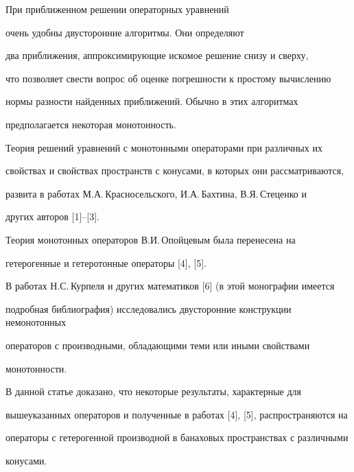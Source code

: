 \maketitle


\label{begin}





При приближенном решении операторных уравнений


очень удобны двусторонние алгоритмы. Они определяют


два приближения, аппроксимирующие искомое решение снизу и сверху,


что позволяет свести вопрос об оценке погрешности к простому вычислению


нормы разности найденных приближений. Обычно в этих алгоритмах


предполагается некоторая монотонность.





Теория решений уравнений с монотонными операторами при различных их


свойствах и свойствах пространств с конусами, в которых они рассматриваются,


развита в работах М.А.\,Красно\-сельского, И.А.\,Бахтина, В.Я.\,Стеценко и


других авторов [1]--[3].


Теория монотонных операторов В.И.\,Опойцевым была перенесена на


гетерогенные и гетеротонные операторы [4], [5].


В работах Н.С.\,Курпеля и других математиков [6] (в этой монографии имеется


подробная библиография) исследовались двусторонние конструкции немонотонных


операторов с производными, обладающими теми или иными свойствами


монотонности.





В данной статье доказано, что некоторые результаты, характерные для


вышеуказанных операторов и полученные в работах [4], [5], распространяются на


операторы с гетерогенной производной в банаховых пространствах с различными


конусами.





